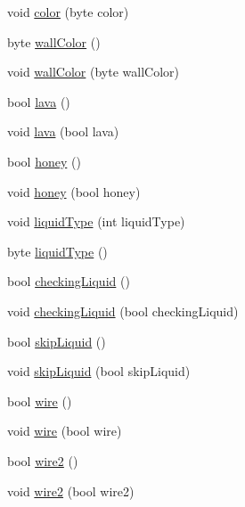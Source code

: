 \begin{DoxyCompactItemize}
void \hyperlink{class_o_t_a_1_1_memory_1_1_mem_tile_a67008577341ea1d732c5121777a5f8dc}{color} (byte color)
\item 
byte \hyperlink{class_o_t_a_1_1_memory_1_1_mem_tile_a642935bb19aa64dea88de6733fa690f4}{wall\+Color} ()
\item 
void \hyperlink{class_o_t_a_1_1_memory_1_1_mem_tile_a6481c6642ef96cfbd69b9913463caef4}{wall\+Color} (byte wall\+Color)
\item 
bool \hyperlink{class_o_t_a_1_1_memory_1_1_mem_tile_a04867e14f6d17bbd07da8ab1491bcdfd}{lava} ()
\item 
void \hyperlink{class_o_t_a_1_1_memory_1_1_mem_tile_a27d65051105ed085e40fe800e7448b69}{lava} (bool lava)
\item 
bool \hyperlink{class_o_t_a_1_1_memory_1_1_mem_tile_a2c4ee24980d228b8d87706cc9c481e1a}{honey} ()
\item 
void \hyperlink{class_o_t_a_1_1_memory_1_1_mem_tile_ab2b5b39a916c14df673e2997f7755c29}{honey} (bool honey)
\item 
void \hyperlink{class_o_t_a_1_1_memory_1_1_mem_tile_a3d798e27e6d3bf4b5eb5a662c4cd6211}{liquid\+Type} (int liquid\+Type)
\item 
byte \hyperlink{class_o_t_a_1_1_memory_1_1_mem_tile_a7e88e785d62a209c571fd9849d703287}{liquid\+Type} ()
\item 
bool \hyperlink{class_o_t_a_1_1_memory_1_1_mem_tile_a54e1e0ae2261c9e7b045ad07407f7780}{checking\+Liquid} ()
\item 
void \hyperlink{class_o_t_a_1_1_memory_1_1_mem_tile_a9529ac65e12f8b701064a0fea470e427}{checking\+Liquid} (bool checking\+Liquid)
\item 
bool \hyperlink{class_o_t_a_1_1_memory_1_1_mem_tile_a6813bd78ab0ee4e8956141df36e0277a}{skip\+Liquid} ()
\item 
void \hyperlink{class_o_t_a_1_1_memory_1_1_mem_tile_a5d4a8cac8800169dfa78bab7371193b8}{skip\+Liquid} (bool skip\+Liquid)
\item 
bool \hyperlink{class_o_t_a_1_1_memory_1_1_mem_tile_a3aae10ff4ee905613c442afbccd37404}{wire} ()
\item 
void \hyperlink{class_o_t_a_1_1_memory_1_1_mem_tile_a110c6dd15ddff33f18466e1e2e366531}{wire} (bool wire)
\item 
bool \hyperlink{class_o_t_a_1_1_memory_1_1_mem_tile_a5e30416a7b7b20f48b95c6ac2329726b}{wire2} ()
\item 
void \hyperlink{class_o_t_a_1_1_memory_1_1_mem_tile_ae9720656f714ccf39c0abc49aefa26c4}{wire2} (bool wire2)
\item 

\end{DoxyCompactItemize}
